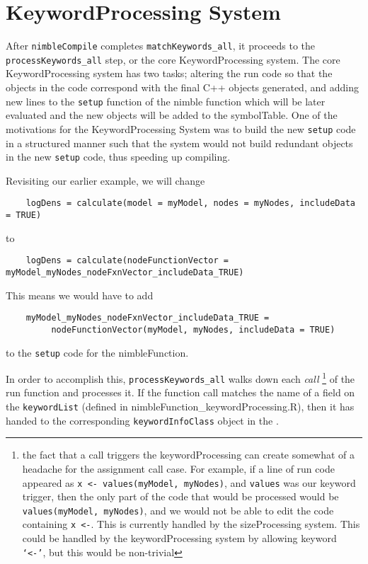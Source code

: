 \documentclass[11pt]{article}
\numberwithin{equation}{section}
\begin{document}
 	\section{KeywordProcessing System}
 
 	After \texttt{nimbleCompile} completes \texttt{matchKeywords\_all}, it proceeds to the \texttt{processKeywords\_all} step, or the core KeywordProcessing system. The core KeywordProcessing system has two tasks; altering the run code so that the objects in the code correspond with the final C++ objects generated, and adding new lines to the \texttt{setup} function of the nimble function which will be later evaluated and the new objects will be added to the symbolTable. One of the motivations for the KeywordProcessing System was to build the new \texttt{setup} code in a structured manner such that the system would not build redundant objects in the new \texttt{setup} code, thus speeding up compiling.
	
	 Revisiting our earlier example, we will change

	\begin{verbatim}
	logDens = calculate(model = myModel, nodes = myNodes, includeData = TRUE)
	\end{verbatim}
		
	to
	
	\begin{verbatim}
	logDens = calculate(nodeFunctionVector = myModel_myNodes_nodeFxnVector_includeData_TRUE)
	\end{verbatim}
	
	This means we would have to add
	
	\begin{verbatim}
	myModel_myNodes_nodeFxnVector_includeData_TRUE =
	     nodeFunctionVector(myModel, myNodes, includeData = TRUE)
	\end{verbatim}	
	
	to the \texttt{setup} code for the nimbleFunction. 
	
	
	In order to accomplish this, \texttt{processKeywords\_all} walks down each \emph{call} \footnote{the fact that a call triggers the keywordProcessing can create somewhat of a headache for the assignment call case. For example, if a line of run code appeared as \texttt{x <- values(myModel, myNodes)}, and \texttt{values} was our keyword trigger, then the only part of the code that would be processed would be \texttt{values(myModel, myNodes)}, and we would not be able to edit the code containing \texttt{x <-}. This is currently handled by the sizeProcessing system. This could be handled by the keywordProcessing system by allowing keyword \texttt{`<-'}, but this would be non-trivial } of the run function and processes it. If the function call matches the name of a field on the \texttt{keywordList} (defined in nimbleFunction\_keywordProcessing.R), then it has handed to the corresponding \texttt{keywordInfoClass} object in the . 
	
\end{document}
